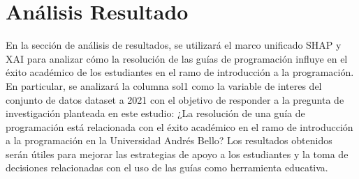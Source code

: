 \hypertarget{analisis_resultado}{%
    \section{Análisis Resultado}\label{Análisis Resultado}}

En la sección de análisis de resultados, se utilizará el marco unificado SHAP y XAI para analizar cómo la resolución de las guías de programación influye en el éxito académico de los estudiantes en el ramo de introducción a la programación. En particular, se analizará la columna sol1 como la variable de interes del conjunto de datos dataset a 2021 con el objetivo de responder a la pregunta de investigación planteada en este estudio: ¿La resolución de una guía de programación está relacionada con el éxito académico en el ramo de introducción a la programación en la Universidad Andrés Bello? Los resultados obtenidos serán útiles para mejorar las estrategias de apoyo a los estudiantes y la toma de decisiones relacionadas con el uso de las guías como herramienta educativa.


